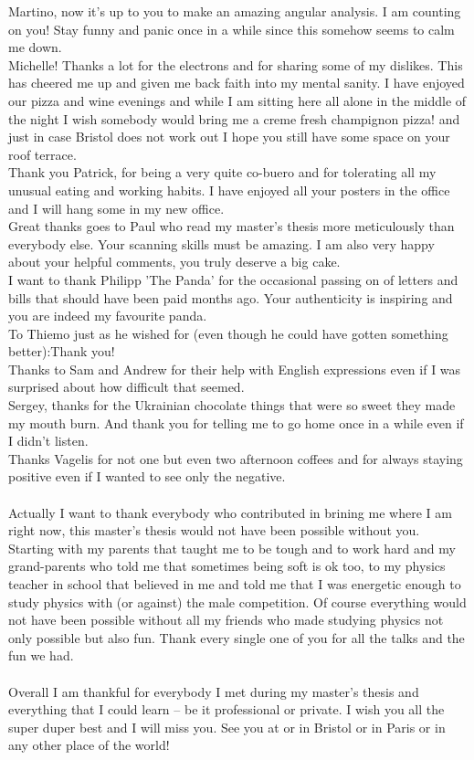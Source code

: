 Martino, now it's up to you to make an amazing angular analysis. I am counting on you! Stay funny and panic once in a while since this somehow seems to calm me down.\\
Michelle! Thanks a lot for the electrons and for sharing some of my dislikes. This has cheered me up and given me back faith into my mental sanity. I have enjoyed our pizza and wine evenings and while I am sitting here all alone in the middle of the night I wish somebody would bring me a creme fresh champignon pizza! and just in case Bristol does not work out I hope you still have some space on your roof terrace.\\
Thank you Patrick, for being a very quite co-buero and for tolerating all my unusual eating and working habits. I have enjoyed all your posters in the office and I will hang some in my new office.\\
Great thanks goes to Paul who read my master's thesis more meticulously than everybody else. Your scanning skills must be amazing. I am also very happy about your helpful comments, you truly deserve a big cake.\\
I want to thank Philipp 'The Panda' for the occasional passing on of letters and bills that should have been paid months ago. Your authenticity is inspiring and you are indeed my favourite panda.\\
To Thiemo just as he wished for (even though he could have gotten something better):Thank you!\\
Thanks to Sam and Andrew for their help with English expressions even if I was surprised about how difficult that seemed. \\
Sergey, thanks for the Ukrainian chocolate things that were so sweet they made my mouth burn. And thank you for telling me to go home once in a while even if I didn't listen.\\
Thanks Vagelis for not one but even two afternoon coffees and for always staying positive even if I wanted to see only the negative.\\
\\
Actually I want to thank everybody who contributed in brining me where I am right now, this master's thesis would not have been possible without you. Starting with my parents that taught me to be tough and to work hard and my grand-parents who told me that sometimes being soft is ok too, to my physics teacher in school that believed in me and told me that I was energetic enough to study physics with (or against) the male competition. Of course everything would not have been possible without all my friends who made studying physics not only possible but also fun. Thank every single one of you for all the talks and the fun we had.\\
\\
Overall I am thankful for everybody I met during my master's thesis and everything that I could learn -- be it professional or private. I wish you all the super duper best and I will miss you. See you at \cern or in Bristol or in Paris or in any other place of the world!